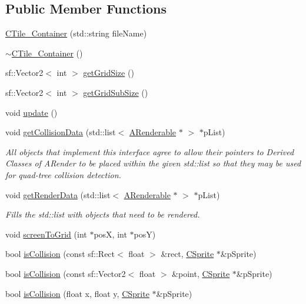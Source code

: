 \subsection*{Public Member Functions}
\begin{DoxyCompactItemize}
\item 
\hyperlink{classCTile__Container_ab3f79e82961b644d422874eb558ea312}{C\-Tile\-\_\-\-Container} (std\-::string file\-Name)
\item 
\hyperlink{classCTile__Container_ac62ffead3e87a0c405d7bd6f25581927}{$\sim$\-C\-Tile\-\_\-\-Container} ()
\item 
sf\-::\-Vector2$<$ int $>$ \hyperlink{classCTile__Container_ae8a4d2b6e49fbec47d92cbb19bb9d3c7}{get\-Grid\-Size} ()
\item 
sf\-::\-Vector2$<$ int $>$ \hyperlink{classCTile__Container_a876984278369d0cafc24890959128ed0}{get\-Grid\-Sub\-Size} ()
\item 
void \hyperlink{classCTile__Container_abe6e19de544f042671094697bb83fde9}{update} ()
\item 
void \hyperlink{classCTile__Container_a1412dde3860cb0f2431dda7d49aa17dc}{get\-Collision\-Data} (std\-::list$<$ \hyperlink{classARenderable}{A\-Renderable} $\ast$ $>$ $\ast$p\-List)
\begin{DoxyCompactList}\small\item\em All objects that implement this interface agree to allow their pointers to Derived Classes of A\-Render to be placed within the given std\-::list so that they may be used for quad-\/tree collision detection. \end{DoxyCompactList}\item 
void \hyperlink{classCTile__Container_a48c74611efadee522595362a79620bff}{get\-Render\-Data} (std\-::list$<$ \hyperlink{classARenderable}{A\-Renderable} $\ast$ $>$ $\ast$p\-List)
\begin{DoxyCompactList}\small\item\em Fills the std\-::list with objects that need to be rendered. \end{DoxyCompactList}\item 
void \hyperlink{classCTile__Container_a14f90644c3a992813a629cea3e81aa38}{screen\-To\-Grid} (int $\ast$pos\-X, int $\ast$pos\-Y)
\item 
bool \hyperlink{classCTile__Container_adfda15836508531632c4ca506caf6360}{is\-Collision} (const sf\-::\-Rect$<$ float $>$ \&rect, \hyperlink{classCSprite}{C\-Sprite} $\ast$\&p\-Sprite)
\item 
bool \hyperlink{classCTile__Container_a4195d75fcc4790946b19ea82fc693a1c}{is\-Collision} (const sf\-::\-Vector2$<$ float $>$ \&point, \hyperlink{classCSprite}{C\-Sprite} $\ast$\&p\-Sprite)
\item 
bool \hyperlink{classCTile__Container_a3c8b4ccbb9afaaa9462a11962b6e2dbd}{is\-Collision} (float x, float y, \hyperlink{classCSprite}{C\-Sprite} $\ast$\&p\-Sprite)
\end{DoxyCompactItemize}


